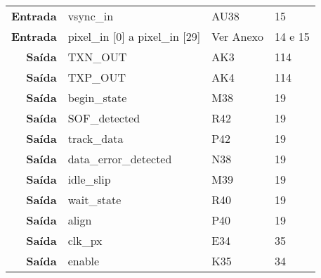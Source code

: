 \begin{table}[h!]
\begin{tabular}{rlll}
		\multicolumn{1}{r|}{\textbf{Entrada}} & vsync\_in                              & AU38                                     & 15                                         \\
		\multicolumn{1}{r|}{\textbf{Entrada}} & pixel\_in {[}0{]} a pixel\_in {[}29{]} & Ver Anexo                                & 14 e 15                                    \\
		\multicolumn{1}{r|}{\textbf{Saída}}   & TXN\_OUT                               & AK3                                      & 114                                        \\
		\multicolumn{1}{r|}{\textbf{Saída}}   & TXP\_OUT                               & AK4                                      & 114                                        \\
		\multicolumn{1}{r|}{\textbf{Saída}}   & begin\_state                           & M38                                      & 19                                         \\
		\multicolumn{1}{r|}{\textbf{Saída}}   & SOF\_detected                          & R42                                      & 19                                         \\
		\multicolumn{1}{r|}{\textbf{Saída}}   & track\_data                            & P42                                      & 19                                         \\
		\multicolumn{1}{r|}{\textbf{Saída}}   & data\_error\_detected                  & N38                                      & 19                                         \\
		\multicolumn{1}{r|}{\textbf{Saída}}   & idle\_slip                             & M39                                      & 19                                         \\
		\multicolumn{1}{r|}{\textbf{Saída}}   & wait\_state                            & R40                                      & 19                                         \\
		\multicolumn{1}{r|}{\textbf{Saída}}   & align                                  & P40                                      & 19                                         \\
		\multicolumn{1}{r|}{\textbf{Saída}}   & clk\_px                                & E34                                      & 35                                         \\
		\multicolumn{1}{r|}{\textbf{Saída}}   & enable                                 & K35                                      & 34                                         \\

\end{tabular}
\end{table}
